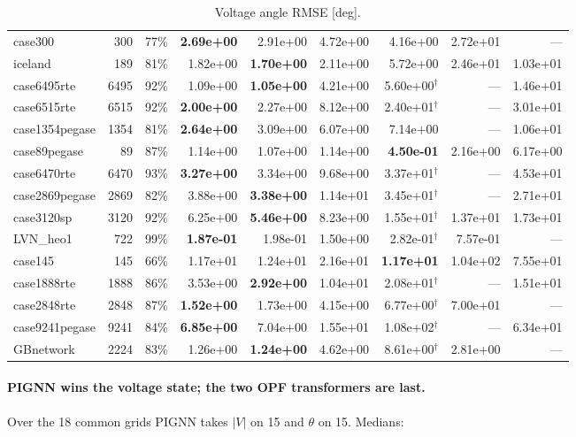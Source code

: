 \documentclass[10pt]{article}
\begin{document}
\begin{landscape}
\begin{table}[H]
\begin{tabular}{lrr rrrrrr}
case300 & 300 & 77\% & \textbf{2.69e+00} & 2.91e+00 & 4.72e+00 & 4.16e+00 & 2.72e+01 & --- \\
iceland & 189 & 81\% & 1.82e+00 & \textbf{1.70e+00} & 2.11e+00 & 5.72e+00 & 2.46e+01 & 1.03e+01 \\
case6495rte & 6495 & 92\% & 1.09e+00 & \textbf{1.05e+00} & 4.21e+00 & 5.60e+00$^\dagger$ & --- & 1.46e+01 \\
case6515rte & 6515 & 92\% & \textbf{2.00e+00} & 2.27e+00 & 8.12e+00 & 2.40e+01$^\dagger$ & --- & 3.01e+01 \\
case1354pegase & 1354 & 81\% & \textbf{2.64e+00} & 3.09e+00 & 6.07e+00 & 7.14e+00 & --- & 1.06e+01 \\
case89pegase & 89 & 87\% & 1.14e+00 & 1.07e+00 & 1.14e+00 & \textbf{4.50e-01} & 2.16e+00 & 6.17e+00 \\
case6470rte & 6470 & 93\% & \textbf{3.27e+00} & 3.34e+00 & 9.68e+00 & 3.37e+01$^\dagger$ & --- & 4.53e+01 \\
case2869pegase & 2869 & 82\% & 3.88e+00 & \textbf{3.38e+00} & 1.14e+01 & 3.45e+01$^\dagger$ & --- & 2.71e+01 \\
case3120sp & 3120 & 92\% & 6.25e+00 & \textbf{5.46e+00} & 8.23e+00 & 1.55e+01$^\dagger$ & 1.37e+01 & 1.73e+01 \\
LVN\_heo1 & 722 & 99\% & \textbf{1.87e-01} & 1.98e-01 & 1.50e+00 & 2.82e-01$^\dagger$ & 7.57e-01 & --- \\
case145 & 145 & 66\% & 1.17e+01 & 1.24e+01 & 2.16e+01 & \textbf{1.17e+01} & 1.04e+02 & 7.55e+01 \\
case1888rte & 1888 & 86\% & 3.53e+00 & \textbf{2.92e+00} & 1.04e+01 & 2.08e+01$^\dagger$ & --- & 1.51e+01 \\
case2848rte & 2848 & 87\% & \textbf{1.52e+00} & 1.73e+00 & 4.15e+00 & 6.77e+00$^\dagger$ & 7.00e+01 & --- \\
case9241pegase & 9241 & 84\% & \textbf{6.85e+00} & 7.04e+00 & 1.55e+01 & 1.08e+02$^\dagger$ & --- & 6.34e+01 \\
GBnetwork & 2224 & 83\% & 1.26e+00 & \textbf{1.24e+00} & 4.62e+00 & 8.61e+00$^\dagger$ & 2.81e+00 & --- \\
\bottomrule
\end{tabular}
\caption{Voltage angle RMSE [deg].}
\end{table}
\end{landscape}

\paragraph{PIGNN wins the voltage state; the two OPF transformers are last.}
Over the 18 common grids PIGNN takes $|V|$ on 15 and $\theta$ on 15. Medians:
\end{document}
